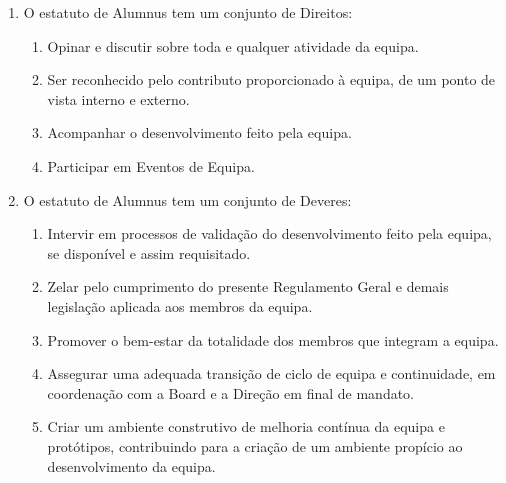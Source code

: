 \begin{enumerate}
\begin{enumerate}
  \end{enumerate}
  \item O estatuto de Alumnus tem um conjunto de Direitos:
  \begin{enumerate}
    \item Opinar e discutir sobre toda e qualquer atividade da equipa.
    \item Ser reconhecido pelo contributo proporcionado à equipa, de um ponto de vista interno e externo.
    \item Acompanhar o desenvolvimento feito pela equipa.
    \item Participar em Eventos de Equipa.
  \end{enumerate}
  \item O estatuto de Alumnus tem um conjunto de Deveres:
  \begin{enumerate}
    \item Intervir em processos de validação do desenvolvimento feito pela equipa, se disponível e assim requisitado.
    \item Zelar pelo cumprimento do presente Regulamento Geral e demais legislação aplicada aos membros da equipa.
    \item Promover o bem-estar da totalidade dos membros que integram a equipa.
    \item Assegurar uma adequada transição de ciclo de equipa e continuidade, em coordenação com a Board e a Direção em final de mandato.
    \item Criar um ambiente construtivo de melhoria contínua da equipa e protótipos, contribuindo para a criação de um ambiente propício ao desenvolvimento da equipa.
  \end{enumerate}
\end{enumerate}

